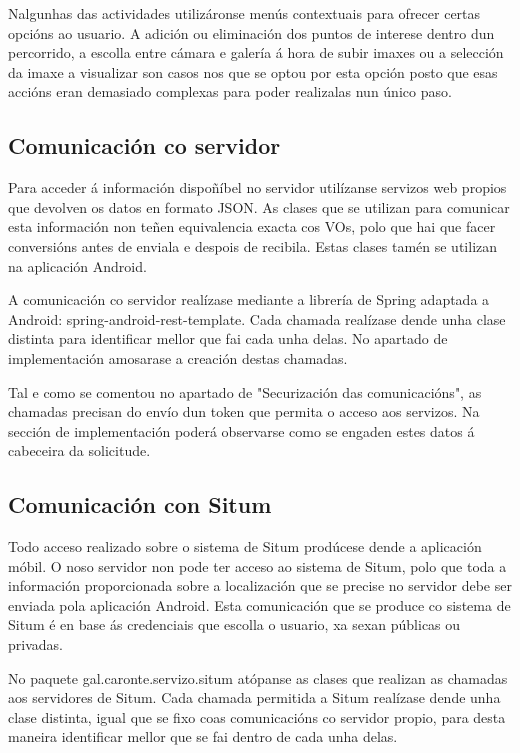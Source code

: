 Nalgunhas das actividades utilizáronse menús contextuais para ofrecer certas opcións ao usuario. A adición ou eliminación dos puntos de interese dentro dun percorrido, a escolla entre cámara e galería á hora de subir imaxes ou a selección da imaxe a visualizar son casos nos que se optou por esta opción posto que esas accións eran demasiado complexas para poder realizalas nun único paso.


\subsection{Comunicación co servidor}
Para acceder á información dispoñíbel no servidor utilízanse servizos web propios que devolven os datos en formato JSON. As clases que se utilizan para comunicar esta información non teñen equivalencia exacta cos VOs, polo que hai que facer conversións antes de enviala e despois de recibila. Estas clases tamén se utilizan na aplicación Android.

A comunicación co servidor realízase mediante a librería de Spring adaptada a Android: spring-android-rest-template. Cada chamada realízase dende unha clase distinta para identificar mellor que fai cada unha delas. No apartado de implementación amosarase a creación destas chamadas.

Tal e como se comentou no apartado de "Securización das comunicacións", as chamadas precisan do envío dun token que permita o acceso aos servizos. Na sección de implementación poderá observarse como se engaden estes datos á cabeceira da solicitude.


\subsection{Comunicación con Situm}
Todo acceso realizado sobre o sistema de Situm prodúcese dende a aplicación móbil. O noso servidor non pode ter acceso ao sistema de Situm, polo que toda a información proporcionada sobre a localización que se precise no servidor debe ser enviada pola aplicación Android. Esta comunicación que se produce co sistema de Situm é en base ás credenciais que escolla o usuario, xa sexan públicas ou privadas.

No paquete gal.caronte.servizo.situm atópanse as clases que realizan as chamadas aos servidores de Situm. Cada chamada permitida a Situm realízase dende unha clase distinta, igual que se fixo coas comunicacións co servidor propio, para desta maneira identificar mellor que se fai dentro de cada unha delas.

